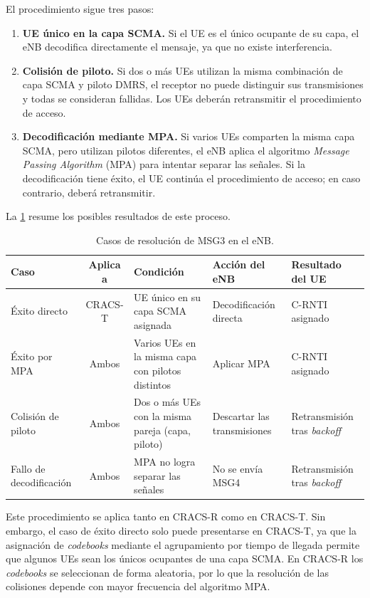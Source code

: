 El procedimiento sigue tres pasos:

\begin{enumerate}[leftmargin=*]
    \item \textbf{UE único en la capa SCMA.} Si el UE es el único ocupante de su capa, el eNB decodifica directamente el mensaje, ya que no existe interferencia.

    \item \textbf{Colisión de piloto.} Si dos o más UEs utilizan la misma combinación de capa SCMA y piloto DMRS, el receptor no puede distinguir sus transmisiones y todas se consideran fallidas. Los UEs deberán retransmitir el procedimiento de acceso.

    \item \textbf{Decodificación mediante MPA.} Si varios UEs comparten la misma capa SCMA, pero utilizan pilotos diferentes, el eNB aplica el algoritmo \emph{Message Passing Algorithm} (MPA) para intentar separar las señales. Si la decodificación tiene éxito, el UE continúa el procedimiento de acceso; en caso contrario, deberá retransmitir.
\end{enumerate}

La \cref{tab:msg3_casos} resume los posibles resultados de este proceso.

\begin{table}[H]
\centering
\caption{Casos de resolución de MSG3 en el eNB.}
\label{tab:msg3_casos}
\small
\begin{tabularx}{\textwidth}{@{}l c X X X@{}}
\toprule
\textbf{Caso} & \textbf{Aplica a} & \textbf{Condición} & \textbf{Acción del eNB} & \textbf{Resultado del UE} \\
\midrule
Éxito directo & CRACS-T & UE único en su capa SCMA asignada & Decodificación directa & C-RNTI asignado \\
Éxito por MPA & Ambos & Varios UEs en la misma capa con pilotos distintos & Aplicar MPA & C-RNTI asignado \\
Colisión de piloto & Ambos & Dos o más UEs con la misma pareja (capa, piloto) & Descartar las transmisiones & Retransmisión tras \emph{backoff} \\
Fallo de decodificación & Ambos & MPA no logra separar las señales & No se envía MSG4 & Retransmisión tras \emph{backoff} \\
\bottomrule
\end{tabularx}
\end{table}

Este procedimiento se aplica tanto en CRACS-R como en CRACS-T. Sin embargo, el caso de éxito directo solo puede presentarse en CRACS-T, ya que la asignación de \textit{codebooks} mediante el agrupamiento por tiempo de llegada permite que algunos UEs sean los únicos ocupantes de una capa SCMA. En CRACS-R los \textit{codebooks} se seleccionan de forma aleatoria, por lo que la resolución de las colisiones depende con mayor frecuencia del algoritmo MPA.
